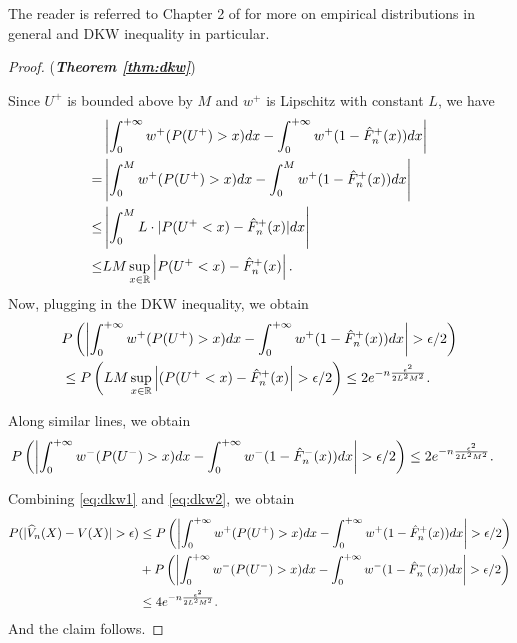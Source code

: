The reader is referred to Chapter 2 of \cite{wasserman2006} for more on empirical distributions in general and DKW inequality in particular.

\begin{proof}(\textbf{\textit{Theorem \ref{thm:dkw}}})

Since $U^+$ is bounded above by $M$ and $w^+$ is Lipschitz with constant $L$, we have
\begin{align*}
&\left|\int_0^{+\infty} w^+(P(U^+)>x) dx- \int_0^{+\infty} w^+(1- {\hat F_n}^+(x)) dx\right|
\\
= & \left|\int_0^M w^+(P(U^+)>x) dx- \int_0^M w^+(1- {\hat F_n}^+(x)) dx\right|
\\
\leq&
\left|\int_0^M L\cdot |P(U^+<x)-{\hat F_n}^+(x)| dx\right|\\
\leq&
LM\sup_{x\in \mathbb{R}}\left|P(U^+<x)-{\hat F_n}^+(x)\right|.
\end{align*}
Now, plugging in the DKW inequality, we obtain
\begin{align}
&
P\left(\left|\intinfinity w^+(P(U^+)>x) dx- \intinfinity w^+(1- {\hat F_n}^+(x)) dx\right|>\epsilon/2\right)
\nonumber\\
&
\leq
 P\left(LM\sup_{x\in \mathbb{R}} \left|(P(U^+<x)-{\hat F_n}^+(x)\right|>\epsilon/2\right) \leq 2 e^{-n \frac{\epsilon^2}{2 L^2 M^2}}.\label{eq:dkw1}
\end{align}

Along similar lines, we obtain
\begin{align}
&
P\left(\left|\intinfinity w^-(P(U^-)>x) dx- \intinfinity w^-(1- {\hat F_n}^-(x)) dx\right|>\epsilon/2\right)
\leq 2 e^{-n \frac{\epsilon^2}{2 L^2 M^2}}.\label{eq:dkw2}
\end{align}

Combining \eqref{eq:dkw1} and \eqref{eq:dkw2}, we obtain
\begin{align*}
P(|\widehat V_n(X) - V(X)|>\epsilon) 
&\le P\left(\left|\intinfinity w^+(P(U^+)>x) dx- \intinfinity w^+(1- {\hat F_n}^+(x)) dx\right|>\epsilon/2\right) \\
&+ 
P\left(\left|\intinfinity w^-(P(U^-)>x) dx- \intinfinity w^-(1- {\hat F_n}^-(x)) dx\right|>\epsilon/2\right)\\
&\le 4 e^{-n \frac{\epsilon^2}{2 L^2 M^2}}.
\end{align*} 
And the claim follows. 
\end{proof}


